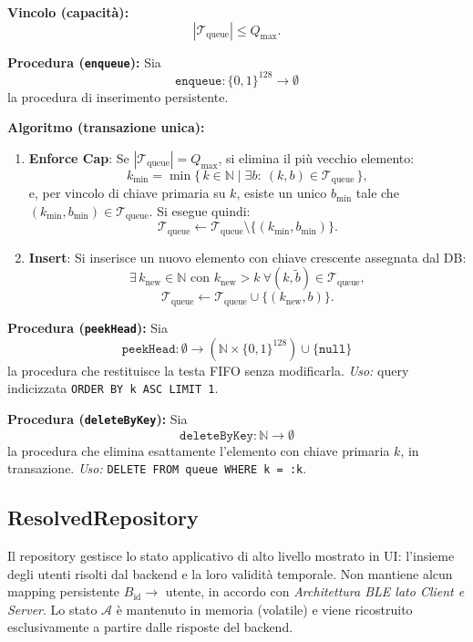 \documentclass[a4paper,11pt,table,dvipsnames]{article}
\begin{document}
\textbf{Vincolo (capacità):}
\[
    |\mathcal{T}_{\text{queue}}| \le Q_{\max}.
\]

\textbf{Procedura (\texttt{enqueue}):}
Sia
\[
    \texttt{enqueue}: \{0,1\}^{128} \rightarrow \emptyset
\]
la procedura di inserimento persistente.

\textbf{Algoritmo (transazione unica):}
\begin{enumerate}
    \item \textbf{Enforce Cap}:
          Se \(|\mathcal{T}_{\text{queue}}| = Q_{\max}\), si elimina il più vecchio elemento:
          \[
              k_{\min} = \min\{\, k \in \mathbb{N} \mid \exists b:\ (k,b)\in \mathcal{T}_{\text{queue}} \,\},
          \]
          e, per vincolo di chiave primaria su \(k\), esiste un unico \(b_{\min}\) tale che \((k_{\min},b_{\min})\in \mathcal{T}_{\text{queue}}\).
          Si esegue quindi:
          \[
              \mathcal{T}_{\text{queue}} \leftarrow \mathcal{T}_{\text{queue}} \setminus \{(k_{\min},b_{\min})\}.
          \]

    \item \textbf{Insert}:
          Si inserisce un nuovo elemento con chiave crescente assegnata dal DB:
          \[
              \exists\, k_{\text{new}}\in\mathbb{N} \text{ con } k_{\text{new}} > k\ \forall (k,\widetilde{b})\in\mathcal{T}_{\text{queue}},
          \]
          \[
              \mathcal{T}_{\text{queue}} \leftarrow \mathcal{T}_{\text{queue}} \cup \{(k_{\text{new}}, b)\}.
          \]
\end{enumerate}

\textbf{Procedura (\texttt{peekHead}):}
Sia
\[
    \texttt{peekHead}: \emptyset \rightarrow (\mathbb{N} \times \{0,1\}^{128}) \cup \{\texttt{null}\}
\]
la procedura che restituisce la testa FIFO senza modificarla.
\emph{Uso:} query indicizzata \texttt{ORDER BY k ASC LIMIT 1}.

\textbf{Procedura (\texttt{deleteByKey}):}
Sia
\[
    \texttt{deleteByKey}: \mathbb{N} \rightarrow \emptyset
\]
la procedura che elimina esattamente l’elemento con chiave primaria \(k\), in transazione.
\emph{Uso:} \texttt{DELETE FROM queue WHERE k = :k}.


\subsection{ResolvedRepository}
Il repository gestisce lo stato applicativo di alto livello mostrato in UI: l’insieme degli utenti risolti dal backend e la loro validità temporale.
Non mantiene alcun mapping persistente \(B_{\text{id}} \rightarrow\) utente, in accordo con \emph{Architettura BLE lato Client e Server}.
Lo stato \(\mathcal{A}\) è mantenuto in memoria (volatile) e viene ricostruito esclusivamente a partire dalle risposte del backend.
\end{document}
